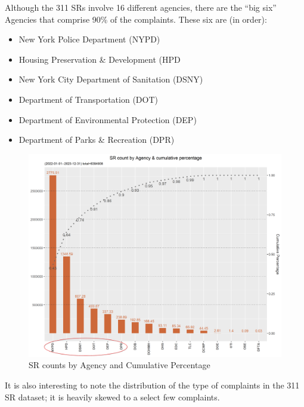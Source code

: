 \documentclass[12pt, titlepage]{article}
\begin{document}
Although the 311 SRs involve 16 different agencies, there are the ``big six'' Agencies that comprise
90\% of the complaints. These six are (in order):  

\begin{itemize}
	\item New York Police Department (NYPD)
	\item Housing Preservation \& Development (HPD
	\item New York City Department of Sanitation (DSNY)
	\item Department of Transportation (DOT)
	\item Department of Environmental Protection (DEP)
	\item Department of Parks \& Recreation (DPR)
\end{itemize}

\begin{figure}[htbp]
  \centering
	  \includegraphics[scale=0.65]{SRs_by_Agency.png}
	  \caption{SR counts by Agency and Cumulative Percentage}
	  \label{fig:SR_counts_by_Agency}
\end{figure}

It is also interesting to note the distribution of the type of complaints in the 311 SR dataset; it is heavily skewed to  a select few complaints.
\end{document}
